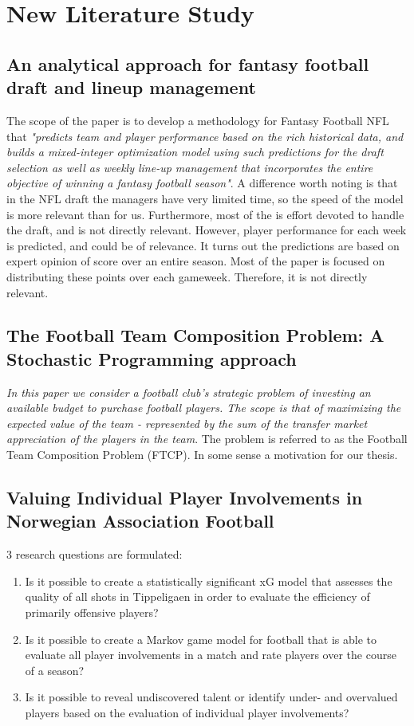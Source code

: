 \iffalse %


\section{New Literature Study} \label{new} 

\subsection{An analytical approach for fantasy football draft
and lineup management}
The scope of the paper is to develop a methodology for Fantasy Football NFL that \textit{"predicts team and player performance based on the rich historical data, and builds a mixed-integer optimization model using such predictions for the draft selection as well as weekly line-up management that incorporates the entire objective of winning a fantasy football season"}. A difference worth noting is that in the NFL draft the managers have very limited time, so the speed of the model is more relevant than for us. Furthermore, most of the is effort devoted to handle the draft, and is not directly relevant. However, player performance for each week is predicted, and could be of relevance. It turns out the predictions are based on expert opinion of score over an entire season. Most of the paper is focused on distributing these points over each gameweek. Therefore, it is not directly relevant. 
\newpar

\subsection{The Football Team Composition Problem: A Stochastic Programming approach}
\textit{In this paper we consider a football club’s strategic problem of investing an available budget to purchase football players. The scope is that of maximizing the expected value of the team - represented by the sum of the transfer market appreciation of the players in the team}. The problem is referred to as the Football Team Composition Problem (FTCP). In some sense a motivation for our thesis.

\subsection{Valuing Individual Player Involvements in
Norwegian Association Football}

3 research questions are formulated:
\begin{enumerate}
    \item Is it possible to create a statistically significant xG model that assesses the quality of all shots in Tippeligaen in order to evaluate the efficiency of primarily offensive players?
    \item Is it possible to create a Markov game model for football that is able to evaluate all player involvements in a match and rate players over the course of a season?
    \item Is it possible to reveal undiscovered talent or identify under- and overvalued players based on the evaluation of individual player involvements?
\end{enumerate} 

